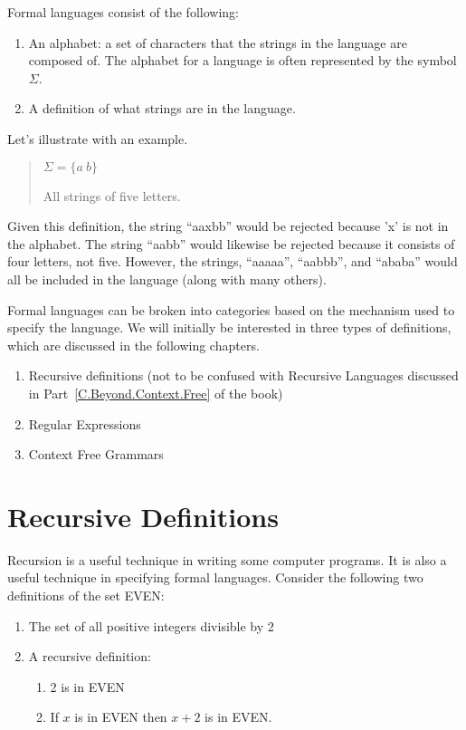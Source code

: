 \documentclass[letterpaper,12pt,openany,reqno]{book}%
\begin{document}
Formal languages consist of the following:
\begin{enumerate}
\item An alphabet: a set of characters that the strings in the language are composed of. The alphabet for a language is often represented by the symbol $\Sigma$.
\item A definition of what strings are in the language.
\end{enumerate}

Let's illustrate with an example. 

\begin{quote}
$\Sigma = \{ a \ b \}$

All strings of five letters.
\end{quote}

Given this definition, the string ``aaxbb'' would be rejected because 'x' is not in the alphabet. The string ``aabb'' would likewise be rejected because it consists of four letters, not five. However, the strings, ``aaaaa'', ``aabbb'', and ``ababa'' would all be included in the language (along with many others).

Formal languages can be broken into categories based on the mechanism used to specify the language. We will initially be interested in three types of definitions, which are discussed in the following chapters.
\begin{enumerate}
\item Recursive definitions (not to be confused with Recursive Languages discussed in Part~\ref{C.Beyond.Context.Free} of the book)
\item Regular Expressions
\item Context Free Grammars
\end{enumerate}

\chapter{Recursive Definitions}
Recursion is a useful technique in writing some computer programs. It is also a useful technique in specifying formal languages. Consider the following two definitions of the set EVEN:
\begin{enumerate}
\item The set of all positive integers divisible by 2
\item A recursive definition:
\begin{enumerate}
\item 2 is in EVEN
\item If $x$ is in EVEN then $x+2$ is in EVEN.
\end{enumerate}
\end{enumerate}
\end{document}
